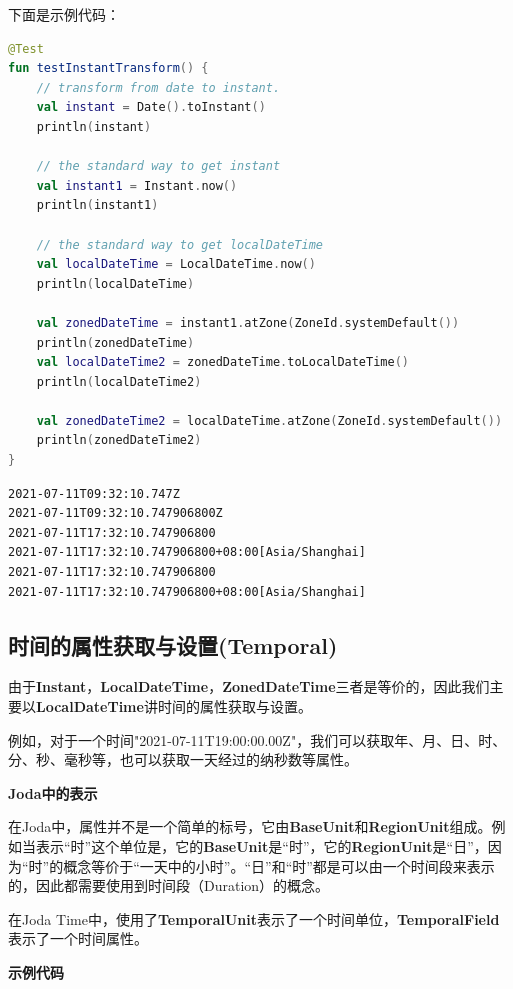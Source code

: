 \documentclass[cn,10pt,math=newtx,citestyle=gb7714-2015,bibstyle=gb7714-2015]{elegantbook}
\begin{document}
    下面是示例代码：

    \begin{lstlisting}[language=Kotlin]
@Test
fun testInstantTransform() {
    // transform from date to instant.
    val instant = Date().toInstant()
    println(instant)

    // the standard way to get instant
    val instant1 = Instant.now()
    println(instant1)

    // the standard way to get localDateTime
    val localDateTime = LocalDateTime.now()
    println(localDateTime)

    val zonedDateTime = instant1.atZone(ZoneId.systemDefault())
    println(zonedDateTime)
    val localDateTime2 = zonedDateTime.toLocalDateTime()
    println(localDateTime2)

    val zonedDateTime2 = localDateTime.atZone(ZoneId.systemDefault())
    println(zonedDateTime2)
}
    \end{lstlisting}

    \begin{lstlisting}[]
2021-07-11T09:32:10.747Z
2021-07-11T09:32:10.747906800Z
2021-07-11T17:32:10.747906800
2021-07-11T17:32:10.747906800+08:00[Asia/Shanghai]
2021-07-11T17:32:10.747906800
2021-07-11T17:32:10.747906800+08:00[Asia/Shanghai]        
    \end{lstlisting}

    \subsection{时间的属性获取与设置(Temporal)}

    由于\textbf{Instant}，\textbf{LocalDateTime}，\textbf{ZonedDateTime}三者是等价的，因此我们主要以\textbf{LocalDateTime}讲时间的属性获取与设置。

    例如，对于一个时间"2021-07-11T19:00:00.00Z"，我们可以获取年、月、日、时、分、秒、毫秒等，也可以获取一天经过的纳秒数等属性。

    \textbf{Joda中的表示}

    在Joda中，属性并不是一个简单的标号，它由\textbf{BaseUnit}和\textbf{RegionUnit}组成。例如当表示“时”这个单位是，它的\textbf{BaseUnit}是“时”，它的\textbf{RegionUnit}是“日”，因为“时”的概念等价于“一天中的小时”。“日”和“时”都是可以由一个时间段来表示的，因此都需要使用到时间段（Duration）的概念。

    在Joda Time中，使用了\textbf{TemporalUnit}表示了一个时间单位，\textbf{TemporalField}表示了一个时间属性。


    \textbf{示例代码}
\end{document}
